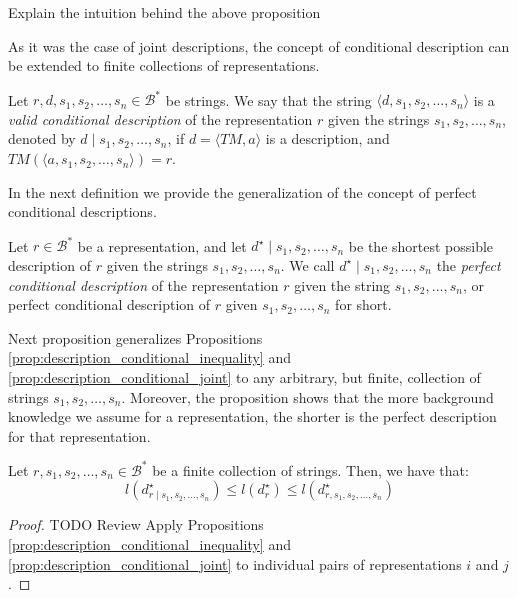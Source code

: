 {\color{red} Explain the intuition behind the above proposition}

As it was the case of joint descriptions, the concept of conditional description can be extended to finite collections of representations.

\begin{definition}
Let $r, d, s_1, s_2, \ldots, s_n \in \mathcal{B}^\ast$ be strings. We say that the string $\langle d, s_1, s_2, \ldots, s_n \rangle$ is a \emph{valid conditional description} of the representation $r$ given the strings $s_1, s_2, \ldots, s_n$, denoted by $d \mid s_1, s_2, \ldots, s_n$, if $d = \langle TM, a \rangle$ is a description, and $TM \left(\langle a, s_1, s_2, \ldots, s_n \rangle \right) = r$.
\end{definition}

In the next definition we provide the generalization of the concept of perfect conditional descriptions.

\begin{definition}
Let $r \in \mathcal{B}^\ast$ be a representation, and let $d^\star \mid s_1, s_2, \ldots, s_n$ be the shortest possible description of $r$ given the strings $s_1, s_2, \ldots, s_n$. We call $d^\star \mid s_1, s_2, \ldots, s_n$ the \emph{perfect conditional description} of the representation $r$ given the string $s_1, s_2, \ldots, s_n$, or perfect conditional description of $r$ given $s_1, s_2, \ldots, s_n$ for short.
\end{definition}

Next proposition generalizes Propositions \ref{prop:description_conditional_inequality} and \ref{prop:description_conditional_joint} to any arbitrary, but finite, collection of strings $s_1, s_2, \ldots, s_n$. Moreover, the proposition shows that the more background knowledge we assume for a representation, the shorter is the perfect description for that representation.

\begin{proposition}
Let $r, s_1, s_2, \ldots, s_n \in \mathcal{B}^\ast$ be a finite collection of strings. Then, we have that:
\[
l \left( d^\star_{r \mid s_1, s_2, \ldots, s_n} \right) \leq l \left( d^\star_r \right) \leq l \left( d^\star_{r,s_1, s_2, \ldots, s_n} \right)
\]
\end{proposition}
\begin{proof}
{\color{red} TODO Review} Apply Propositions \ref{prop:description_conditional_inequality} and \ref{prop:description_conditional_joint} to individual pairs of representations $i$ and $j$.
\end{proof}

